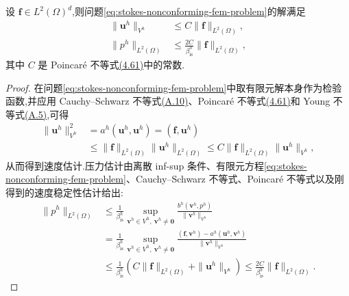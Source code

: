 \begin{lemma}[有限元解的稳定性]\label{lem:stokes-nonconforming-stability}
设 $\bm{f}\in L^2(\Omega)^d$,则问题\cref{eq:stokes-nonconforming-fem-problem}的解满足
\[
\begin{aligned}
  \|\bm{u}^h\|_{V^h}
  &\leq C\|\bm{f}\|_{L^2(\Omega)},\\
  \|p^h\|_{L^2(\Omega)}
  &\leq \frac{2C}{\beta_{\mathrm{is}}^h}
         \|\bm{f}\|_{L^2(\Omega)},
\end{aligned}
\]
其中 $C$ 是 Poincaré 不等式\hyperref[eq:stokes-nonconforming-poincare]{(4.61)}中的常数.
\end{lemma}
\begin{proof}
在问题\cref{eq:stokes-nonconforming-fem-problem}中取有限元解本身作为检验函数,并应用 Cauchy--Schwarz 不等式\hyperref[eq:appendix-a-10]{(A.10)}、Poincaré 不等式\hyperref[eq:stokes-nonconforming-poincare]{(4.61)}和 Young 不等式\hyperref[eq:appendix-a-5]{(A.5)},可得
\[
\begin{aligned}
  \|\bm{u}^h\|_{V^h}^2
  &=a^h(\bm{u}^h,\bm{u}^h)
    =(\bm{f},\bm{u}^h)\\
  &\leq\|\bm{f}\|_{L^2(\Omega)}
        \|\bm{u}^h\|_{L^2(\Omega)}
   \leq C\|\bm{f}\|_{L^2(\Omega)}
        \|\bm{u}^h\|_{V^h},
\end{aligned}
\]
从而得到速度估计.压力估计由离散 inf-sup 条件、有限元方程\cref{eq:stokes-nonconforming-fem-problem}、Cauchy--Schwarz 不等式、Poincaré 不等式以及刚得到的速度稳定性估计给出:
\[
\begin{aligned}
  \|p^h\|_{L^2(\Omega)}
  &\leq\frac{1}{\beta_{\mathrm{is}}^h}
    \sup_{\bm{v}^h\in V^h,\ \bm{v}^h\ne\bm{0}}
    \frac{b^h(\bm{v}^h,p^h)}{\|\bm{v}^h\|_{V^h}}\\
  &=\frac{1}{\beta_{\mathrm{is}}^h}
    \sup_{\bm{v}^h\in V^h,\ \bm{v}^h\ne\bm{0}}
    \frac{(\bm{f},\bm{v}^h)-a^h(\bm{u}^h,\bm{v}^h)}
         {\|\bm{v}^h\|_{V^h}}\\
  &\leq\frac{1}{\beta_{\mathrm{is}}^h}
       \left(C\|\bm{f}\|_{L^2(\Omega)}
             +\|\bm{u}^h\|_{V^h}\right)
   \leq\frac{2C}{\beta_{\mathrm{is}}^h}
       \|\bm{f}\|_{L^2(\Omega)}.
\end{aligned}
\]
\end{proof}

